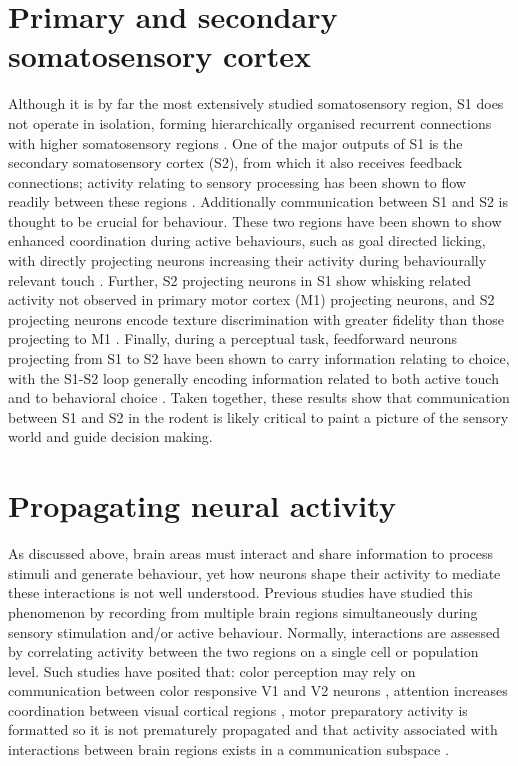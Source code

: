 \section{Primary and secondary somatosensory cortex}

Although it is by far the most extensively studied somatosensory region, S1 does not operate in isolation, forming hierarchically organised recurrent connections with higher somatosensory regions \cite{felleman_distributed_1991, kamatani_experience-dependent_2007, kwon_sensory_2016}. One of the major outputs of S1 is the secondary somatosensory cortex (S2), from which it also receives feedback connections; activity relating to sensory processing has been shown to flow readily between these regions \cite{aronoff_long-range_2010}. Additionally communication between S1 and S2 is thought to be crucial for behaviour. These two regions have been shown to show enhanced coordination during active behaviours, such as goal directed licking, with directly projecting neurons increasing their activity during behaviourally relevant touch \cite{chen_long-range_2016}. Further, S2 projecting neurons in S1 show whisking related activity not observed in primary motor cortex (M1) projecting neurons, and S2 projecting neurons encode texture discrimination with greater fidelity than those projecting to M1 \cite{chen_behaviour-dependent_2013}. Finally, during a perceptual task, feedforward neurons projecting from S1 to S2 have been shown to carry information relating to choice, with the S1-S2 loop generally encoding information related to both active touch and to behavioral choice \cite{kwon_sensory_2016}. Taken together, these results show that communication between S1 and S2 in the rodent is likely critical to paint a picture of the sensory world and guide decision making.  

\section{Propagating neural activity}

As discussed above, brain areas must interact and share information to process stimuli and generate behaviour, yet how neurons shape their activity to mediate these interactions is not well understood. Previous studies have studied this phenomenon by recording from multiple brain regions simultaneously during sensory stimulation and/or active behaviour. Normally, interactions are assessed by correlating activity between the two regions on a single cell or population level. Such studies have posited that: color perception may rely on communication between color responsive V1 and V2 neurons \cite{roe_specificity_1999}, attention increases coordination between visual cortical regions \cite{ruff_attention_2016}, motor preparatory activity is formatted so it is not prematurely propagated \cite{kaufman_cortical_2014} and that activity associated with interactions between brain regions exists in a communication subspace \cite{semedo_cortical_2019}. 

